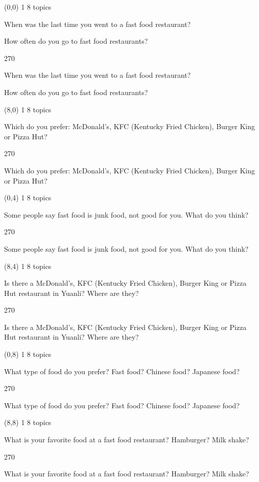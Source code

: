 \documentclass[a4paper]{article}
\newenvironment{itemize*}%
{\begin{itemize}%
 \setlength{\itemsep}{0.5cm}%
 \setlength{\parsep}{0pt}%
 \setlength{\parskip}{0pt}}%
{\end{itemize}}
\newcommand{\mycard}[3]{%
	\small #1 #2
	\par
	\parbox[t][6.8cm][c]{9.5cm}{%
	\par
	\myleft{#3}
	\par
	\myright{#3}
	}
}
\newcommand{\myleft}[1]{%
	\begin{sideways}
	\hspace*{-0.9cm}
		\parbox[t][2.7cm][t]{6.5cm}{%
		\large #1
		}
	\end{sideways}
}
\newcommand{\myright}[1]{%
	\hspace*{6.5cm}
	\begin{turn}{270}
	\hspace*{-7.1cm}
		\parbox[t][2.7cm][t]{6.5cm}{%
		\large #1
		}
	\end{turn}
}
\begin{document}
\begin{textblock}{8}(0,0)
\mycard{1}{8 topics}{
\begin{itemize*}
\item When was the last time you went to a fast food restaurant?
\item How often do you go to fast food restaurants?
\end{itemize*}
}
\end{textblock}

\begin{textblock}{8}(8,0)
\mycard{1}{8 topics}{
\begin{itemize*}
\item Which do you prefer: McDonald's, KFC (Kentucky Fried Chicken), Burger King or Pizza Hut?
\end{itemize*}
}
\end{textblock}

\begin{textblock}{8}(0,4)
\mycard{1}{8 topics}{
\begin{itemize*}
\item Some people say fast food is junk food, not good for you. What do you think?
\end{itemize*}
}
\end{textblock}

\begin{textblock}{8}(8,4)
\mycard{1}{8 topics}{
\begin{itemize*}
\item Is there a McDonald's, KFC (Kentucky Fried Chicken), Burger King or Pizza Hut restaurant in Yuanli? Where are they?
\end{itemize*}
}
\end{textblock}

\begin{textblock}{8}(0,8)
\mycard{1}{8 topics}{
\begin{itemize*}
\item What type of food do you prefer? Fast food? Chinese food? Japanese food?
\end{itemize*}
}
\end{textblock}

\begin{textblock}{8}(8,8)
\mycard{1}{8 topics}{
\begin{itemize*}
\item What is your favorite food at a fast food restaurant? Hamburger? Milk shake?
\end{itemize*}
}
\end{textblock}
\end{document}
